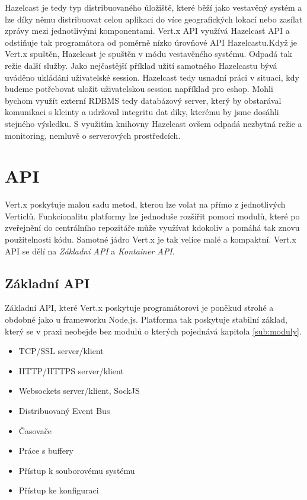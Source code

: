 Hazelcast je tedy typ distribuovaného úložiště, které běží jako vestavěný systém a lze díky němu distribuovat celou aplikaci do více geografických lokací nebo zasílat zprávy mezi jednotlivými komponentami. Vert.x API využívá Hazelcast API a odstiňuje tak programátora od poměrně nízko úrovňové API Hazelcastu.Když je Vert.x spuštěn, Hazelcast je spuštěn v módu vestavěného systému. Odpadá tak režie další služby. Jako nejčastější příklad užití samotného Hazelcastu bývá uváděno ukládání uživatelské session\cite{session}. Hazelcast tedy usnadní práci v situaci, kdy budeme potřebovat uložit uživatelskou session například pro eshop. Mohli bychom využít externí RDBMS tedy databázový server, který by obstarával komunikaci s kleinty a udržoval integritu dat díky, kterému by jsme dosáhli stejného výsledku. S využitím knihovny Hazelcast ovšem odpadá nezbytná režie a monitoring, nemluvě o serverových prostředcích.

\section{API}\label{sub:API}

Vert.x poskytuje malou sadu metod, kterou lze volat na přímo z jednotlivých Verticlů.
Funkcionalitu platformy lze jednoduše rozšířit pomocí modulů, které po zveřejnění do centrálního repozitáře může využívat kdokoliv a pomáhá tak znovu použitelnosti kódu. Samotné jádro Vert.x je tak velice malé a kompaktní. Vert.x API se dělí na \emph{Základní API} a \emph{Kontainer API}.

\subsection{Základní API}\label{sub:coreAPI}

Základní API, které Vert.x poskytuje programátorovi je poněkud strohé a obdobné jako u frameworku Node.js. Platforma tak poskytuje stabilní základ, který se v praxi neobejde bez modulů o kterých pojednává kapitola \ref{sub:moduly}.

\begin{itemize}
\item{TCP/SSL server/klient}
\item{HTTP/HTTPS server/klient}
\item{Websockets server/klient, SockJS}
\item{Distribuovaný Event Bus}
\item{Časovače}
\item{Práce s buffery}
\item{Přístup k souborovému systému}
\item{Přístup ke konfiguraci}
\end{itemize}

